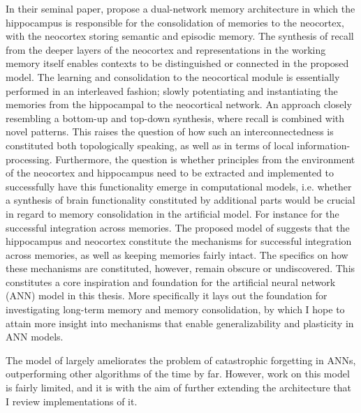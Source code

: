 In their seminal paper, \cite{McClelland1995} propose a dual-network memory architecture in which the hippocampus is responsible for the consolidation of memories to the neocortex, with the neocortex storing semantic and episodic memory. The synthesis of recall from the deeper layers of the neocortex and representations in the working memory itself enables contexts to be distinguished or connected in the proposed model. The learning and consolidation to the neocortical module is essentially performed in an interleaved fashion; slowly potentiating and instantiating the memories from the hippocampal to the neocortical network. An approach closely resembling a bottom-up and top-down synthesis, where recall is combined with novel patterns. This raises the question of how such an interconnectedness is constituted both topologically speaking, as well as in terms of local information-processing. Furthermore, the question is whether principles from the environment of the neocortex and hippocampus need to be extracted and implemented to successfully have this functionality emerge in computational models, i.e. whether a synthesis of brain functionality constituted by additional parts would be crucial in regard to memory consolidation in the artificial model. For instance for the successful integration across memories. The proposed model of \citep{McClelland1995} suggests that the hippocampus and neocortex constitute the mechanisms for successful integration across memories, as well as keeping memories fairly intact. The specifics on how these mechanisms are constituted, however, remain obscure or undiscovered. This constitutes a core inspiration and foundation for the artificial neural network (ANN) model in this thesis. More specifically it lays out the foundation for investigating long-term memory and memory consolidation, by which I hope to attain more insight into mechanisms that enable generalizability and plasticity in ANN models.

The model of \cite{McClelland1995} largely ameliorates the problem of catastrophic forgetting in ANNs, outperforming other algorithms of the time by far. However, work on this model is fairly limited, and it is with the aim of further extending the architecture that I review implementations of it.

